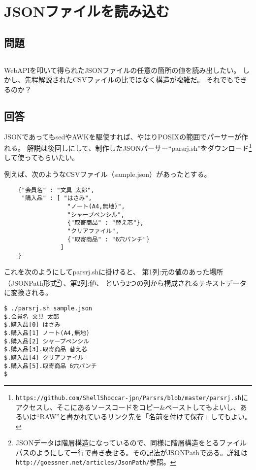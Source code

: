 \section{JSONファイルを読み込む}
\label{recipe:JSON_parser}

\subsection*{問題}
\noindent
$\!\!\!\!\!$
\begin{grshfboxit}{160.0mm}
	WebAPIを叩いて得られたJSONファイルの任意の箇所の値を読み出したい。
	しかし、先程解説されたCSVファイルの比ではなく構造が複雑だ。
	それでもできるのか？
\end{grshfboxit}

\subsection*{回答}
JSONであってもsedやAWKを駆使すれば、やはりPOSIXの範囲でパーサーが作れる。
解説は後回しにして、制作したJSONパーサー``parsrj.sh''をダウンロード\footnote{\verb|https://github.com/ShellShoccar-jpn/Parsrs/blob/master/parsrj.sh|にアクセスし、そこにあるソースコードをコピー\&{}ペーストしてもよいし、あるいは``RAW''と書かれているリンク先を「名前を付けて保存」してもよい。}して使ってもらいたい。

例えば、次のようなCSVファイル（sample.json）があったとする。\\
\begin{frameboxit}{160.0mm}
\begin{verbatim}
	{"会員名" : "文具 太郎",
	 "購入品" : [ "はさみ",
	              "ノート(A4,無地)",
	              "シャープペンシル",
	              {"取寄商品" : "替え芯"},
	              "クリアファイル",
	              {"取寄商品" : "6穴パンチ"}
	            ]
	}
\end{verbatim}
\end{frameboxit}

これを次のようにしてparsrj.shに掛けると、
第1列:元の値のあった場所（JSONPath形式\footnote{JSONデータは階層構造になっているので、同様に階層構造をとるファイルパスのようにして一行で書き表せる。その記法がJSONPathである。詳細は\verb|http://goessner.net/articles/JsonPath/|参照。}）、第2列:値、
という2つの列から構成されるテキストデータに変換される。
\begin{screen}
	\verb|$ ./parsrj.sh sample.json| \return \\
	\verb|$.会員名 文具 太郎| \\
	\verb|$.購入品[0] はさみ| \\
	\verb|$.購入品[1] ノート(A4,無地)| \\
	\verb|$.購入品[2] シャープペンシル| \\
	\verb|$.購入品[3].取寄商品 替え芯| \\
	\verb|$.購入品[4] クリアファイル| \\
	\verb|$.購入品[5].取寄商品 6穴パンチ| \\
	\verb|$ |
\end{screen}

